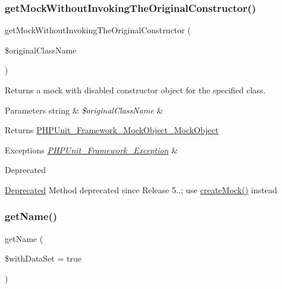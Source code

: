 \subsubsection{\texorpdfstring{get\+Mock\+Without\+Invoking\+The\+Original\+Constructor()}{getMockWithoutInvokingTheOriginalConstructor()}}
{\footnotesize\ttfamily get\+Mock\+Without\+Invoking\+The\+Original\+Constructor (\begin{DoxyParamCaption}\item[{}]{\$original\+Class\+Name }\end{DoxyParamCaption})\hspace{0.3cm}{\ttfamily [protected]}}

Returns a mock with disabled constructor object for the specified class.


\begin{DoxyParams}[1]{Parameters}
string & {\em \$original\+Class\+Name} & \\
\hline
\end{DoxyParams}
\begin{DoxyReturn}{Returns}
\mbox{\hyperlink{interface_p_h_p_unit___framework___mock_object___mock_object}{P\+H\+P\+Unit\+\_\+\+Framework\+\_\+\+Mock\+Object\+\_\+\+Mock\+Object}}
\end{DoxyReturn}

\begin{DoxyExceptions}{Exceptions}
{\em \mbox{\hyperlink{class_p_h_p_unit___framework___exception}{P\+H\+P\+Unit\+\_\+\+Framework\+\_\+\+Exception}}} & \\
\hline
\end{DoxyExceptions}
\begin{DoxyRefDesc}{Deprecated}
\item[\mbox{\hyperlink{deprecated__deprecated000031}{Deprecated}}]Method deprecated since Release 5..; use \mbox{\hyperlink{class_p_h_p_unit___framework___test_case_add70f35672c920c22639c26308a644e3}{create\+Mock()}} instead \end{DoxyRefDesc}
\mbox{\label{class_p_h_p_unit___framework___test_case_ac0adb6264f478d5f7cfee90335b6d5bd}} 
\subsubsection{\texorpdfstring{get\+Name()}{getName()}}
{\footnotesize\ttfamily get\+Name (\begin{DoxyParamCaption}\item[{}]{\$with\+Data\+Set = {\ttfamily true} }\end{DoxyParamCaption})}

